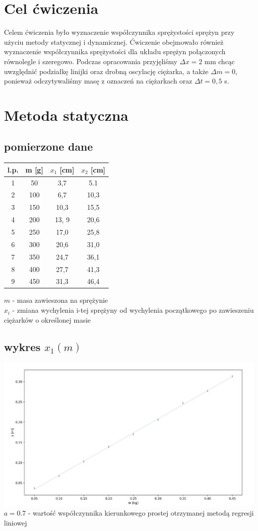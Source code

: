 \documentclass{article}
\begin{document}
\section{Cel ćwiczenia}
Celem ćwiczenia było wyznaczenie współczynnika sprężystości sprężyn przy użyciu metody statycznej i dynamicznej.  Ćwiczenie obejmowało również wyznaczenie współczynnika sprężystości dla układu sprężyn połączonych równolegle i szeregowo. Podczas opracowania przyjęliśmy $\Delta x = 2$ mm chcąc uwzględnić podziałkę linijki oraz drobną oscylację ciężarka, a także $\Delta m = 0$, 
ponieważ odczytywaliśmy masę z oznaczeń na ciężarkach oraz $\Delta t = 0,5 $ s.

\section{Metoda statyczna}
\subsection{pomierzone dane}
\begin{center}
\begin{tabular}{ c | c | c | c}
l.p. & m [g] & $x_1$ [cm] & $x_2$ [cm]\\
\hline
 1    & 50 & 3,7 & 5.1\\ 
 2    & 100 & 6,7 & 10,3\\ 
 3  & 150 & 10,3 & 15,5\\ 
 4  & 200 & 13, 9 & 20,6\\
 5   & 250 & 17,0 &25,8\\
 6  & 300 & 20,6 & 31,0\\
 7  & 350 & 24,7 & 36,1\\
 8  & 400 & 27,7 & 41,3\\
 9  & 450 & 31,3 & 46,4

\end{tabular}
\end{center}
$m$ - masa zawieszona na sprężynie \\
$x_i$ - zmiana wychylenia i-tej sprężyny od wychylenia początkowego po zawieszeniu ciężarków o określonej masie

\subsection{wykres $x_1(m)$}
\includegraphics[width=15cm]{m7_1}\\
 $a = 0.7$  - wartość współczynnika kierunkowego prostej otrzymanej metodą regresji liniowej
\end{document}
